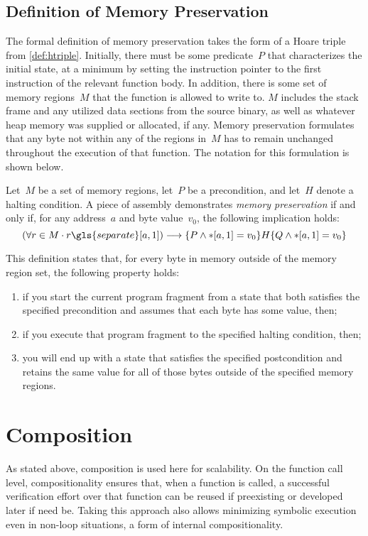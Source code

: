 \subsection{Definition of Memory Preservation}\label{sse:mem_pres}
The formal definition of memory preservation%
takes the form of a Hoare triple from \cref{def:htriple}.
Initially, there must be some predicate~$P$ that characterizes the initial state,
at a minimum by setting the instruction pointer
to the first instruction of the relevant function body.
In addition, there is some set of memory regions~$M$
that the function is allowed to write to.
$M$ includes the stack frame and any utilized data sections from the source binary,
as well as whatever heap memory was supplied or allocated, if any.
Memory preservation formulates that any byte not within any of the regions in~$M$
has to remain unchanged throughout the execution of that function.
The notation for this formulation is shown below.
\begin{definition}\label{mem_pres_hoare}
  Let~$M$ be a set of memory regions, let~$P$ be a precondition,
  and let~$H$ denote a halting condition.
  A piece of assembly demonstrates \emph{memory preservation} if and only if,
  for any address~$a$ and byte value~$v_0$, the following implication holds:
  \begin{equation}
  (\forall r\in M\cdot r\gls{separate}\region{a}1)\longrightarrow\htriple{P\land \readmem{a}1=v_0}H{Q\land\readmem{a}1=v_0}
  \end{equation}
\end{definition}
This definition states that, for every byte in memory outside of the memory region set,
the following property holds:
\begin{enumerate}
  \item if you start the current program fragment from a state that both satisfies
  the specified precondition and assumes that each byte has some value, then;
  \item if you execute that program fragment to the specified halting condition, then;
  \item you will end up with a state that satisfies the specified postcondition
  and retains the same value for all of those bytes outside of the specified memory regions.
\end{enumerate}

\section{Composition}\label{se:cfg_composition}
As stated above, composition is used here for scalability.%
On the function call level, compositionality ensures that,
when a function is called,
a successful verification effort over that function can be reused
if preexisting or developed later if need be.
Taking this approach also allows minimizing symbolic execution
even in non-loop situations, a form of internal compositionality.

